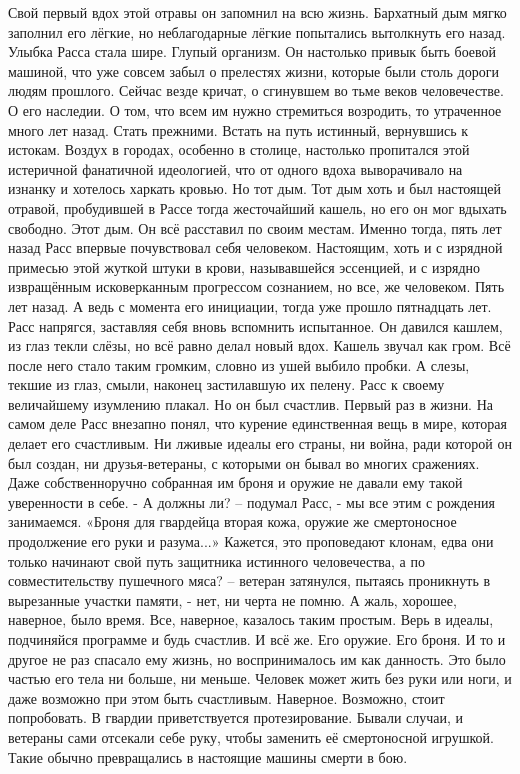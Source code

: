 \documentclass[a4paper, 12pt]{report}
\begin{document}
Свой первый вдох этой отравы он запомнил на всю жизнь. Бархатный дым мягко заполнил его лёгкие, но неблагодарные лёгкие попытались вытолкнуть его назад. Улыбка Расса стала шире. Глупый организм. Он настолько привык быть боевой машиной, что уже совсем забыл о прелестях жизни, которые были столь дороги людям прошлого. Сейчас везде кричат, о сгинувшем во тьме веков человечестве. О его наследии. О том, что всем им нужно стремиться возродить, то утраченное много лет назад. Стать прежними. Встать на путь истинный, вернувшись к истокам. Воздух в городах, особенно в столице, настолько пропитался этой истеричной фанатичной идеологией, что от одного вдоха выворачивало на изнанку и хотелось харкать кровью. Но тот дым. Тот дым хоть и был настоящей отравой, пробудившей в Рассе тогда жесточайший кашель, но его он мог вдыхать свободно. Этот дым. Он всё расставил по своим местам. Именно тогда, пять лет назад Расс впервые почувствовал себя человеком. Настоящим, хоть и с изрядной примесью этой жуткой штуки в крови, называвшейся эссенцией, и с изрядно извращённым исковерканным прогрессом сознанием, но все, же человеком. Пять лет назад. А ведь с момента его инициации, тогда уже прошло пятнадцать лет. Расс напрягся, заставляя себя вновь вспомнить испытанное. 
Он давился кашлем, из глаз текли слёзы, но всё равно делал новый вдох. Кашель звучал как гром. Всё после него стало таким громким, словно из ушей выбило пробки. А слезы, текшие из глаз, смыли, наконец застилавшую их пелену. Расс к своему величайшему изумлению плакал. Но он был счастлив. Первый раз в жизни.
На самом деле Расс внезапно понял, что курение единственная вещь в мире, которая делает его счастливым. Ни лживые идеалы его страны, ни война, ради которой он был создан, ни друзья-ветераны, с которыми он бывал во многих сражениях. Даже собственноручно собранная им броня и оружие не давали ему такой уверенности в себе.
- А должны ли? – подумал Расс, - мы все этим с рождения занимаемся. «Броня для гвардейца вторая кожа, оружие же смертоносное продолжение его руки и разума...» Кажется, это проповедают клонам, едва они только начинают свой путь защитника истинного человечества, а по совместительству пушечного мяса? – ветеран затянулся, пытаясь проникнуть в вырезанные участки памяти, - нет, ни черта не помню. А жаль, хорошее, наверное, было время. Все, наверное, казалось таким простым. Верь в идеалы, подчиняйся программе и будь счастлив.
  И всё же. Его оружие. Его броня. И то и другое не раз спасало ему жизнь, но воспринималось им как данность. Это было частью его тела ни больше, ни меньше. Человек может жить без руки или ноги, и даже возможно при этом быть счастливым. Наверное. Возможно, стоит попробовать. В гвардии приветствуется протезирование. Бывали случаи, и ветераны сами отсекали себе руку, чтобы заменить её смертоносной игрушкой. Такие обычно превращались в настоящие машины смерти в бою.
\end{document}
